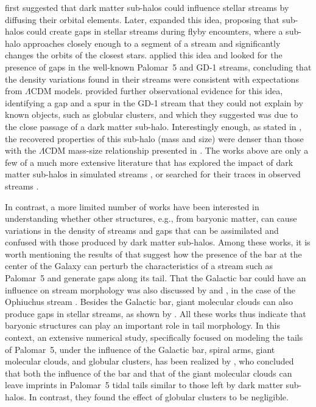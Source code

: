 \documentclass{aa}
\begin{document}
  \citet{2002MNRAS.332..915I} first suggested that dark matter sub-halos could influence stellar streams by diffusing their orbital elements. Later, \citet{2012ApJ...748...20C} expanded this idea, proposing that sub-halos could create gaps in stellar streams during flyby encounters, where a sub-halo approaches closely enough to a segment of a stream and significantly changes the orbits of the closest stars.  \citet{2012ApJ...760...75C, 2013ApJ...768..171C} applied this idea and looked for the presence of gaps in the well-known Palomar~5 and GD-1 streams, concluding that the density variations found in their streams were consistent with expectations from $\Lambda$CDM models. \citet{2019ApJ...880...38B} provided further observational evidence for this idea, identifying a gap and a spur in the GD-1 stream that they could not explain by known objects, such as globular clusters, and which they suggested was due to the close passage of a dark matter sub-halo. Interestingly enough, as stated in \citet{2019ApJ...880...38B}, the recovered properties of this sub-halo (mass and size) were denser than those with the $\Lambda$CDM mass-size relationship presented in \cite{2017MNRAS.466.4974M}. The works above are only a few of a much more extensive literature that has explored the impact of dark matter sub-halos in simulated streams \citep{2016ApJ...828L..10H, 2021MNRAS.507.1999H, 2021JCAP...10..043B, 2024arXiv240402953H, 2024arXiv241021174N}, or searched for their traces in observed streams \citep{2016MNRAS.460.2711T, 2017MNRAS.470...60E, 2020ApJ...889...70B, 2020ApJ...892L..37B}.

  In contrast, a more limited number of works have been interested in understanding whether other structures, e.g., from baryonic matter, can cause variations in the density of streams and gaps that can be assimilated and confused with those produced by dark matter sub-halos.  Among these works, it is worth mentioning the results of \citet{2017NatAs...1..633P} that suggest how the presence of the bar at the center of the Galaxy can perturb the characteristics of a stream such as Palomar~5 and generate gaps along its tail. That the Galactic bar could have an influence on stream morphology was also discussed by \citet{2016MNRAS.460..497H} and \citet{2016ApJ...824..104P}, in the case of the Ophiuchus stream \citep{2014MNRAS.443L..84B}. Besides the Galactic bar, giant molecular clouds can also produce gaps in stellar streams, as shown by \citet{2016MNRAS.463L..17A}. All these works thus indicate that baryonic structures can play an important role in tail morphology. In this context,  an extensive numerical study, specifically focused on modeling the tails of Palomar~5, under the influence of the Galactic bar, spiral arms, giant molecular clouds, and globular clusters, has been realized by \citet{2019MNRAS.484.2009B}, who concluded that both the influence of the bar and that of the giant molecular clouds can leave imprints in Palomar~5 tidal tails similar to those left by dark matter sub-halos. In contrast, they found the effect of globular clusters to be negligible. 
  
\end{document}
